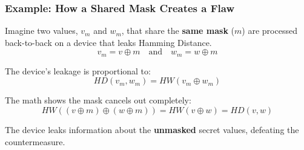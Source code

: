 \begin{frame}
    \frametitle{Example: How a Shared Mask Creates a Flaw}
    
    Imagine two values, $v_m$ and $w_m$, that share the \textbf{same mask} ($m$) are processed back-to-back on a device that leaks Hamming Distance.
    \[ v_m = v \oplus m \quad \text{and} \quad w_m = w \oplus m \]
    
    The device's leakage is proportional to:
    \[ HD(v_m, w_m) = HW(v_m \oplus w_m) \]
    
    The math shows the mask cancels out completely:
    \[ HW((v \oplus m) \oplus (w \oplus m)) = HW(v \oplus w) = HD(v, w) \]
    
    \begin{alertblock}{}
        The device leaks information about the \textbf{unmasked} secret values, defeating the countermeasure.
    \end{alertblock}

\end{frame}


